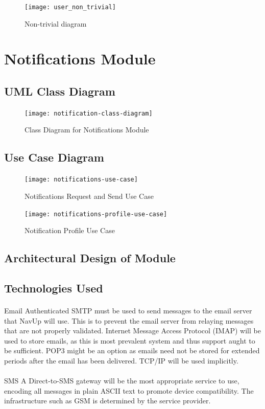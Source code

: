 \documentclass{article}
\begin{document}
\begin{figure}[H]
\texttt{[image: user\_non\_trivial]}
\caption{Non-trivial diagram}
\end{figure}


\section{Notifications Module}
\subsection{UML Class Diagram}
\begin{figure}[H]
\texttt{[image: notification-class-diagram]}
\caption{Class Diagram for Notifications Module}
\end{figure}
\subsection{Use Case Diagram}
\begin{figure}[H]
\texttt{[image: notifications-use-case]}
\caption{Notifications Request and Send Use Case}
\end{figure}
\begin{figure}[H]
\texttt{[image: notifications-profile-use-case]}
\caption{Notification Profile Use Case}
\end{figure}

\subsection{Architectural Design of Module}

\subsection{Technologies Used}
\paragraph{}Email Authenticated SMTP must be used to send messages to the email server that
NavUp will use. This is to prevent the email server from relaying messages that are
not properly validated. Internet Message Access Protocol (IMAP) will be used to store
emails, as this is most prevalent system and thus support aught to be sufficient. POP3
might be an option as emails need not be stored for extended periods after the email
has been delivered. TCP/IP will be used implicitly.
\paragraph{}SMS A Direct-to-SMS gateway will be the most appropriate service to use, encoding
all messages in plain ASCII text to promote device compatibility. The infrastructure
such as GSM is determined by the service provider.
\end{document}
